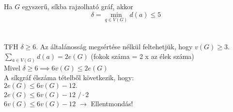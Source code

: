 \begin{frame}
\begin{tcolorbox}[title={Tétel: Minimális fokszáma síkgráfban.}]
Ha $G$ egyszerű, síkba rajzolható gráf, akkor $$\delta = \min_{{q \in V(G)}} d(a) \leq 5$$\\
\tcblower
\msmallskip
\underline{}\\
\mmedskip
TFH $\delta \geq 6$.
Az általánosság megsértése nélkül feltehetjük, hogy $v(G) \geq 3$.\\
$\sum_{{a \in V(G)}} d(a) = 2e(G)$ (fokok száma = 2 x az élek száma)\\
Mivel $\delta \geq 6 \implies 6v(G) \leq 2e(G)$\\
A síkgráf élszáma tételből következik, hogy:\\
$2e(G) \leq 6v(G) - 12.$\\
\mbigskip
$2e(G) \leq 6v(G) - 12$ \hspace{1ex} $/\cdot2$\\
$6v(G) \leq 6v(G) - 12$ $\rightarrow$ Ellentmondás!
\end{tcolorbox}
\end{frame}

